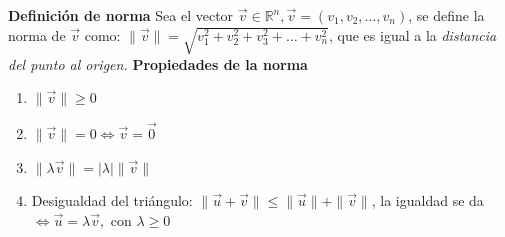 \documentclass[12pt]{article}
\begin{document}
\noindent\textbf{Definición de norma} \newline
Sea el vector $\vec{v}\in\mathbb{R}^n, \vec{v}=(v_1,v_2,\dots,v_n)$, se define la norma de $\vec{v}$ como:\newline
$\|\vec{v}\|=\sqrt{v_1^{2}+v_2^{2}+v_3^{2}+\dots+v_n^2}$, que es igual a la 
\emph{distancia del punto al origen.} \newline
\newline
\textbf{Propiedades de la norma}
\begin{enumerate}
     \item $\|\vec{v}\|\geq0$
     \item $\|\vec{v}\|=0 \Leftrightarrow \vec{v}=\vec{0}$
     \item $\|\lambda\vec{v}\|=|\lambda|\|\vec{v}\|$
     \item Desigualdad del triángulo: $\|\vec{u}+\vec{v}\|\leq \|\vec{u}\|+\|\vec{v}\|$, la igualdad se da 
     $\Leftrightarrow\vec{u}=\lambda\vec{v},\text{ con }\lambda\geq0$
\end{enumerate}
\end{document}

